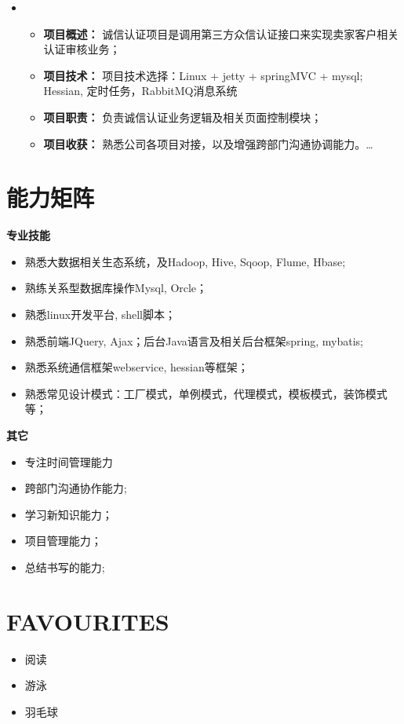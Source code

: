 \documentclass[line,margin]{res}
\begin{document}
\begin{resume}
\begin{itemize}
\item {} \\
    \begin{itemize}
		\item {\bf 项目概述：} 诚信认证项目是调用第三方众信认证接口来实现卖家客户相关认证审核业务；
		\item {\bf 项目技术：} 项目技术选择：Linux + jetty + springMVC + mysql; Hessian, 定时任务，RabbitMQ消息系统 
        \item {\bf 项目职责：} 负责诚信认证业务逻辑及相关页面控制模块；
		\item {\bf 项目收获：} 熟悉公司各项目对接，以及增强跨部门沟通协调能力。\ldots 
	\end{itemize}	
 \end{itemize}



 \section{能力矩阵}
  {\bf 专业技能}
 \begin{itemize}
 \item 熟悉大数据相关生态系统，及Hadoop, Hive, Sqoop, Flume, Hbase;
 \item 熟练关系型数据库操作Mysql, Orcle；
 \item 熟悉linux开发平台, shell脚本；
 \item 熟悉前端JQuery, Ajax；后台Java语言及相关后台框架spring, mybatis;
 \item 熟悉系统通信框架webservice, hessian等框架；
 \item 熟悉常见设计模式：工厂模式，单例模式，代理模式，模板模式，装饰模式等；
 \end{itemize}
 {\bf 其它}
  \begin{itemize}
 \item 专注时间管理能力
 \item 跨部门沟通协作能力;
 \item 学习新知识能力；
 \item 项目管理能力；
 \item 总结书写的能力;
 \end{itemize}


\section{FAVOURITES}
\begin{itemize}
 \item 阅读
 \item 游泳
 \item 羽毛球
\end{itemize}	


\end{resume}
\end{document}
